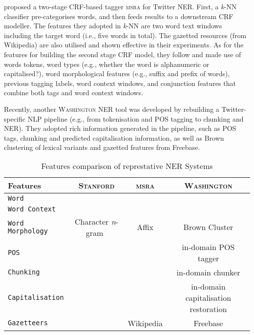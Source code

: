 \documentclass[11pt]{article}
\newcommand{\eg}{e.g.,\xspace}
\newcommand{\ie}{i.e.,\xspace}
\newcommand{\ngram}{\textit{n}-gram\ }
\newcommand{\stanford}{\textsc{Stanford}\xspace}
\newcommand{\washington}{\textsc{Washington}\xspace}
\newcommand{\msra}{\textsc{msra}\xspace}
\newcommand{\feature}[1]{\texttt{#1}\xspace}
\newcommand{\cmark}{\ding{51}}%
\newcommand{\xmark}{\ding{55}}%
\begin{document}
 proposed a two-stage CRF-based tagger \msra for Twitter NER.
First, a \textit{k}-NN classifier pre-categorises words, and then feeds results to a downstream CRF modeller.
The features they adopted in \textit{k}-NN are two word text windows including the target word (\ie five words in total).
The gazetted resources (from Wikipedia) are also utilised and shown effective in their experiments.
As for the features for building the second stage CRF model, they follow  and made use of words tokens, word types (\eg whether the word is alphanumeric or capitalised?), word morphological features (\eg suffix and prefix of words), previous tagging labels, word context windows, and conjunction features that combine both tags and word context windows.

Recently, another \washington NER tool was developed by rebuilding a Twitter-specific NLP pipeline (\eg from tokenisation and POS tagging to chunking and NER).
They adopted rich information generated in the pipeline, such as POS tags, chunking and predicted capitalisation information, as well as Brown clustering of lexical variants and gazetted features from Freebase.

\begin{table*}[!htp]
\begin{center}
\begin{tabular}{lccc}
\hline 
Features                                     & \stanford & \msra & \washington \\ 
\hline
\feature{Word}                               & \cmark & \cmark & \cmark \\
\feature{Word Context}                       & \cmark & \cmark & \cmark \\
\feature{Word Morphology}                    & Character \ngram  & Affix & Brown Cluster \\
\feature{POS}                                & \cmark & \xmark & in-domain POS tagger\\
\feature{Chunking}                           & \xmark & \xmark & in-domain chunker \\
\feature{Capitalisation}                     & \xmark & \cmark & in-domain capitalisation restoration\\
\feature{Gazetteers}                         & \xmark & Wikipedia & Freebase \\
\hline
\end{tabular}
\end{center}
\caption{Features comparison of represtative NER Systems}
\label{tab:fea_comp}
\end{table*}
\end{document}

